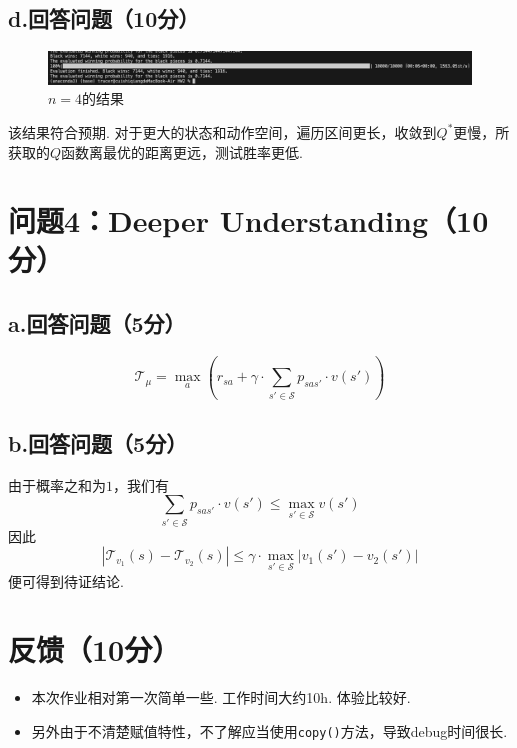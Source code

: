 \documentclass{article}
\begin{document}
\subsection*{d.回答问题（10分）}
\begin{figure}[H]
    \centering
    \includegraphics[width=15cm]{pics/4_eval_2.png}
    \caption{$n=4$的结果}
\end{figure}
该结果符合预期. 对于更大的状态和动作空间，遍历区间更长，收敛到$Q^*$更慢，所获取的$Q$函数离最优的距离更远，测试胜率更低.

\section*{问题4：Deeper Understanding（10分）}
\subsection*{a.回答问题（5分）}
\[\mathcal{T}_ \mu = \max_a \left(r_{sa}+ \gamma \cdot \sum_{s'\in\mathcal{S}} p_{sas'}\cdot v(s')\right)\]

\subsection*{b.回答问题（5分）}
由于概率之和为$1$，我们有
\[\sum_{s'\in\mathcal{S}} p_{sas'}\cdot v(s') \le \max_{s'\in\mathcal{S}}v(s')\]
因此
\[|\mathcal{T}_{v_1}(s)-\mathcal{T}_{v_2}(s)| \le \gamma \cdot \max_{s'\in\mathcal{S}}|v_1(s')-v_2(s')|\]
便可得到待证结论.


\section*{反馈（10分）}

\begin{itemize}
    \item 本次作业相对第一次简单一些. 工作时间大约10h. 体验比较好.
    \item 另外由于不清楚赋值特性，不了解应当使用\lstinline|copy()|方法，导致debug时间很长.
\end{itemize}
\end{document}

